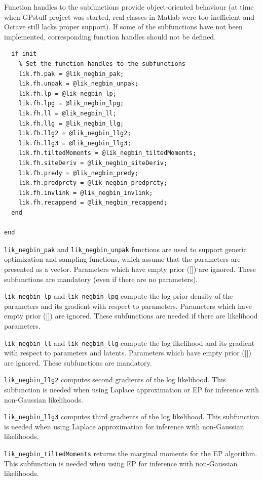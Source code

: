 \documentclass[twoside,11pt]{article}
\newcommand{\code}[1]{{\normalfont\texttt{#1}}}
\begin{document}
Function handles to the subfunctions provide object-oriented
behaviour (at time when GPstuff project was started, real classes
in Matlab were too inefficient and Octave still lacks proper support).
If some of the subfunctions have not been implemented,
corresponding function handles should not be defined.
\begin{verbatim}
  if init
    % Set the function handles to the subfunctions
    lik.fh.pak = @lik_negbin_pak;
    lik.fh.unpak = @lik_negbin_unpak;
    lik.fh.lp = @lik_negbin_lp;
    lik.fh.lpg = @lik_negbin_lpg;
    lik.fh.ll = @lik_negbin_ll;
    lik.fh.llg = @lik_negbin_llg;    
    lik.fh.llg2 = @lik_negbin_llg2;
    lik.fh.llg3 = @lik_negbin_llg3;
    lik.fh.tiltedMoments = @lik_negbin_tiltedMoments;
    lik.fh.siteDeriv = @lik_negbin_siteDeriv;
    lik.fh.predy = @lik_negbin_predy;
    lik.fh.predprcty = @lik_negbin_predprcty;
    lik.fh.invlink = @lik_negbin_invlink;
    lik.fh.recappend = @lik_negbin_recappend;
  end

end
\end{verbatim}

\code{lik\_negbin\_pak} and \code{lik\_negbin\_unpak} functions are
used to support generic optimization and sampling functions, which
assume that the parameters are presented as a vector. Parameters which
have empty prior ([]) are ignored. These subfunctions are
mandatory (even if there are no parameters).

\code{lik\_negbin\_lp} and \code{lik\_negbin\_lpg} compute the log
prior density of the parameters and its gradient with respect to
parameters. Parameters which have empty prior ([]) are ignored.
These subfunctions are needed if there are likelihood parameters.

\code{lik\_negbin\_ll} and \code{lik\_negbin\_llg} compute the log
likelihood and its gradient with respect to parameters and latents.
Parameters which have empty prior ([]) are ignored. These
subfunctions are mandatory.

\code{lik\_negbin\_llg2} computes second gradients of the log
likelihood. This subfunction is needed when using Laplace
approximation or EP for inference with non-Gaussian likelihoods.

\code{lik\_negbin\_llg3} computes third gradients of the log
likelihood. This subfunction is needed when using Laplace
approximation for inference with non-Gaussian likelihoods.

\code{lik\_negbin\_tiltedMoments} returns the marginal moments for
the EP algorithm. This subfunction is needed when using EP for
inference with non-Gaussian likelihoods.
\end{document}
